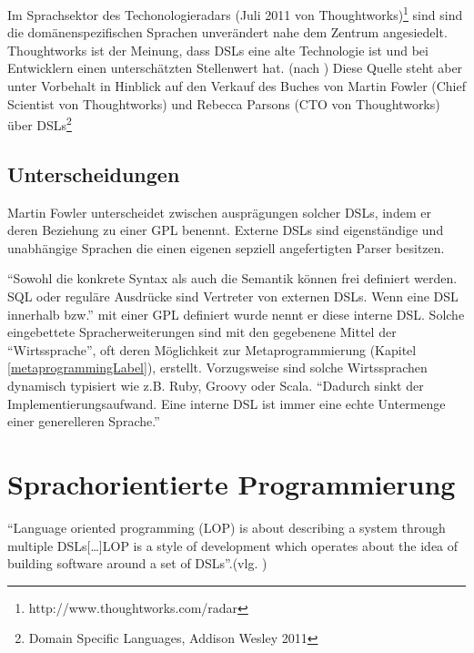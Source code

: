 \documentclass[11pt,english,ngerman, headsepline]{scrreprt}
\begin{document}

 
Im Sprachsektor des Techonologieradars (Juli 2011 von
Thoughtworks)\footnote{http://www.thoughtworks.com/radar}
sind sind die domänenspezifischen Sprachen unverändert nahe dem Zentrum
angesiedelt. Thoughtworks ist der Meinung, dass DSLs eine alte Technologie ist
und bei Entwicklern einen unterschätzten Stellenwert
hat. (nach \cite{thoughtworks-tr}) Diese Quelle steht aber unter Vorbehalt in
Hinblick auf den Verkauf des Buches von Martin Fowler (Chief Scientist von
Thoughtworks) und Rebecca Parsons (CTO von Thoughtworks) über DSLs\footnote{Domain Specific
Languages, Addison Wesley 2011} 


\subsection{Unterscheidungen}

Martin Fowler unterscheidet zwischen ausprägungen solcher DSLs, indem er deren
Beziehung zu einer GPL benennt. Externe DSLs sind eigenständige und unabhängige
Sprachen die einen eigenen sepziell angefertigten Parser besitzen. 

``Sowohl die konkrete Syntax als auch die Semantik können frei definiert
werden. SQL oder reguläre Ausdrücke sind Vertreter von externen DSLs. Wenn eine
DSL innerhalb bzw.'' \cite{wikidsl}
mit einer GPL definiert wurde nennt er diese interne DSL. Solche eingebettete Spracherweiterungen sind mit den
gegebenene Mittel der ``Wirtssprache'', oft deren Möglichkeit zur
Metaprogrammierung (Kapitel \ref{metaprogrammingLabel}), erstellt.
Vorzugsweise sind solche Wirtssprachen dynamisch typisiert wie z.B. Ruby, Groovy
oder Scala. 
``Dadurch sinkt der Implementierungsaufwand. Eine interne DSL ist immer eine echte
Untermenge einer generelleren Sprache.'' \cite{wikidsl}


\section{Sprachorientierte Programmierung}

``Language oriented programming (LOP) is about describing a system through
multiple DSLs[\ldots]LOP is a style of development which operates about
the idea of building software around a set of DSLs''.(vlg.
\cite{fowler2005language})
\end{document}
